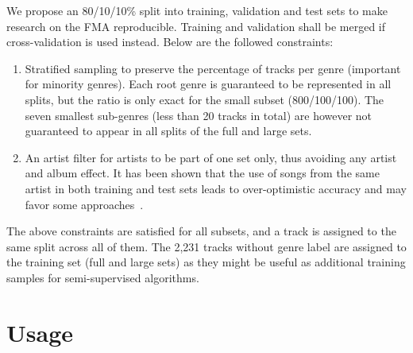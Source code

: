 \documentclass{article}
\newcommand{\todo}[1]{{\color{red} #1}}
\begin{document}
We propose an 80/10/10\% split into training, validation and test sets to make research on the FMA reproducible. Training and validation shall be merged if cross-validation is used instead.
Below are the followed constraints:
\begin{enumerate}
	\item Stratified sampling to preserve the percentage of tracks per genre (important for minority genres). Each root genre is guaranteed to be represented in all splits, but the ratio is only exact for the small subset (800/100/100). The seven smallest sub-genres (less than 20 tracks in total) are however not guaranteed to appear in all splits of the full and large sets.
	\item An artist filter for artists to be part of one set only, thus avoiding any artist and album effect. It has been shown that the use of songs from the same artist in both training and test sets leads to over-optimistic accuracy and may favor some approaches~\cite{artist_filters_1, artist_filters_2}.
\end{enumerate}
The above constraints are satisfied for all subsets, and a track is assigned to the same split across all of them. The 2,231 tracks without genre label are assigned to the training set (full and large sets) as they might be useful as additional training samples for semi-supervised algorithms.


\section{Usage} %
\end{document}
